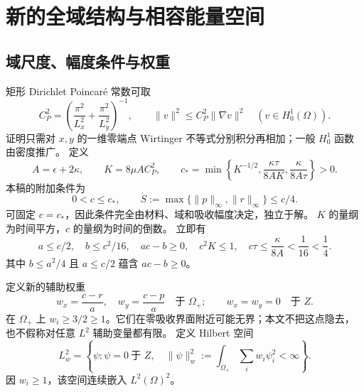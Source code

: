 \documentclass[UTF8,a4paper,11pt,fontset=none]{ctexart}
\numberwithin{equation}{section}
\theoremstyle{definition}
\theoremstyle{definition}
\newcommand{\Om}{\Omega}
\newcommand{\eps}{\epsilon}
\begin{document}
\section{新的全域结构与相容能量空间}
\label{sec:data}

\subsection{域尺度、幅度条件与权重}
矩形 Dirichlet Poincar\'e 常数可取
\begin{equation}\label{eq:poincare}
 C_P^2=\left(\frac{\pi^2}{L_x^2}+\frac{\pi^2}{L_y^2}\right)^{-1},
 \qquad \|v\|^2\le C_P^2\|\nabla v\|^2\quad(v\in H_0^1(\Om)).
\end{equation}
证明只需对 $x,y$ 的一维零端点 Wirtinger 不等式分别积分再相加；一般 $H_0^1$ 函数由密度推广。
定义
\begin{equation}\label{eq:constants}
 A=\eps+2\kappa,\qquad K=8\mu A C_P^2,
 \qquad
 c_* =\min\left\{K^{-1/2},\frac{\kappa\tau}{8AK},\frac{\kappa}{8A\tau}\right\}>0.
\end{equation}
本稿的附加条件为
\begin{equation}\label{eq:smallness}
 0<c\le c_*,\qquad
 S:=\max\{\|p\|_\infty,\|r\|_\infty\}\le c/4.
\end{equation}
可固定 $c=c_*$，因此条件完全由材料、域和吸收幅度决定，独立于解。
$K$ 的量纲为时间平方，$c$ 的量纲为时间的倒数。
立即有
\begin{equation}\label{eq:consequences}
 a\le c/2,\quad b\le c^2/16,\quad ac-b\ge0,\quad
 c^2K\le1,\quad c\tau\le\frac{\kappa}{8A}<\frac1{16}<\frac14.
\end{equation}
其中 $b\le a^2/4$ 且 $a\le c/2$ 蕴含 $ac-b\ge0$。

定义新的辅助权重
\begin{equation}\label{eq:weights}
 w_x=\frac{c-r}{a},\quad w_y=\frac{c-p}{a}\quad\text{于 }\Om_+;
 \qquad w_x=w_y=0\quad\text{于 }Z.
\end{equation}
在 $\Om_+$ 上 $w_i\ge3/2\ge1$。它们在零吸收界面附近可能无界；本文不把这点隐去，也不假称对任意 $L^2$ 辅助变量都有限。
定义 Hilbert 空间
\begin{equation}\label{eq:weighted-space}
 L_w^2=\left\{\psi:\psi=0\ \text{于 }Z,\quad
 \|\psi\|_w^2:=\int_{\Om_+}\sum_iw_i\psi_i^2<\infty\right\}.
\end{equation}
因 $w_i\ge1$，该空间连续嵌入 $L^2(\Om)^2$。
\end{document}

